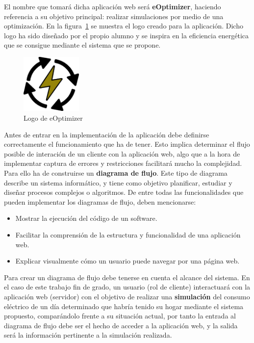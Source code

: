 El nombre que tomará dicha aplicación web será \textbf{eOptimizer}, haciendo referencia a su objetivo principal: realizar simulaciones por medio de una optimización. En la figura~\ref{fig:logo} se muestra el logo creado para la aplicación. Dicho logo ha sido diseñado por el propio alumno y se inspira en la eficiencia energética que se consigue mediante el sistema que se propone.
\begin{figure}[!h]
            \centering
            \includegraphics[width=3cm]{figs/logo.png}
            \caption{Logo de eOptimizer}
            \label{fig:logo}
\end{figure}

Antes de entrar en la implementación de la aplicación debe definirse correctamente el funcionamiento que ha de tener. Esto implica determinar el flujo posible de interación de un cliente con la aplicación web, algo que a la hora de implementar captura de errores y restricciones facilitará mucho la complejidad. Para ello ha de construirse un \textbf{diagrama de flujo}. Este tipo de diagrama describe un sistema informático, y tiene como objetivo planificar, estudiar y diseñar procesos complejos o algoritmos. De entre todas las funcionalidades que pueden implementar los diagramas de flujo, deben mencionarse:
\begin{itemize}
\item Mostrar la ejecución del código de un software.
\item Facilitar la comprensión de la estructura y funcionalidad de una aplicación web.
\item Explicar visualmente cómo un usuario puede navegar por una página web.
\end{itemize}
Para crear un diagrama de flujo debe tenerse en cuenta el alcance del sistema. En el caso de este trabajo fin de grado, un usuario (rol de cliente) interactuará con la aplicación web (servidor) con el objetivo de realizar una \textbf{simulación} del consumo eléctrico de un día determinado que habría tenido su hogar mediante el sistema propuesto, comparándolo frente a su situación actual, por tanto la entrada al diagrama de flujo debe ser el hecho de acceder a la aplicación web, y la salida será la información pertinente a la simulación realizada.\\

